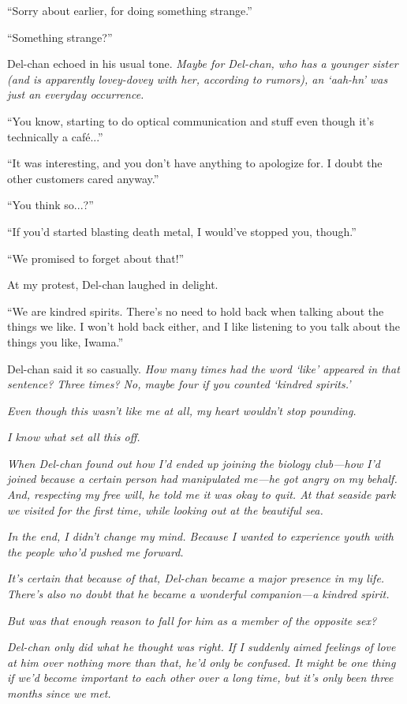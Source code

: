 \documentclass[
    a4paper,
    12pt,
    twoside,
    openany,
    UTF8,
    fontset=windows
]{ctexbook}
\begin{document}
``Sorry about earlier, for doing something strange.''

``Something strange?''

Del-chan echoed in his usual tone. \textit{Maybe for Del-chan, who has a younger sister (and is apparently lovey-dovey with her, according to rumors), an `aah-hn' was just an everyday occurrence.}

``You know, starting to do optical communication and stuff even though it's technically a café...''

``It was interesting, and you don't have anything to apologize for. I doubt the other customers cared anyway.''

``You think so...?''

``If you'd started blasting death metal, I would've stopped you, though.''

``We promised to forget about that!''

At my protest, Del-chan laughed in delight.

``We are kindred spirits. There's no need to hold back when talking about the things we like. I won't hold back either, and I like listening to you talk about the things you like, Iwama.''

Del-chan said it so casually. \textit{How many times had the word `like' appeared in that sentence? Three times? No, maybe four if you counted `kindred spirits.'}

\textit{Even though this wasn't like me at all, my heart wouldn't stop pounding.}

\textit{I know what set all this off.}

\textit{When Del-chan found out how I'd ended up joining the biology club---how I'd joined because a certain person had manipulated me---he got angry on my behalf. And, respecting my free will, he told me it was okay to quit. At that seaside park we visited for the first time, while looking out at the beautiful sea.}

\textit{In the end, I didn't change my mind. Because I wanted to experience youth with the people who'd pushed me forward.}

\textit{It's certain that because of that, Del-chan became a major presence in my life. There's also no doubt that he became a wonderful companion---a kindred spirit.}

\textit{But was that enough reason to fall for him as a member of the opposite sex?}

\textit{Del-chan only did what he thought was right. If I suddenly aimed feelings of love at him over nothing more than that, he'd only be confused. It might be one thing if we'd become important to each other over a long time, but it's only been three months since we met.}
\end{document}
